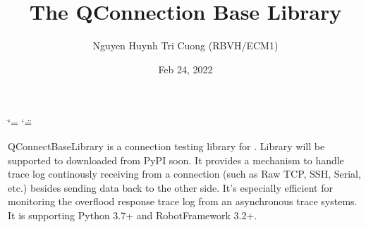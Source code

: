 \documentclass[letterpaper,10pt,english]{sphinxmanual}
\title{The QConnection Base Library}
\date{Feb 24, 2022}
\author{Nguyen Huynh Tri Cuong (RBVH/ECM1)}
\begin{document}
\ifdefined\shorthandoff
  \ifnum\catcode`\=\string=\active\shorthandoff{=}\fi
  \ifnum\catcode`\"=\active{}\fi
\fi

\pagestyle{empty}
\sphinxmaketitle
\pagestyle{plain}
\sphinxtableofcontents
\pagestyle{normal}
\label{\detokenize{index::doc}}


\sphinxAtStartPar
QConnectBaseLibrary is a connection testing library for . Library will be supported to
downloaded from PyPI soon. It provides a mechanism to handle trace log
continously receiving from a connection (such as Raw TCP, SSH, Serial,
etc.) besides sending data back to the other side. It’s especially
efficient for monitoring the overflood response trace log from an
asynchronous trace systems. It is supporting Python 3.7+ and
RobotFramework 3.2+.
\end{document}
